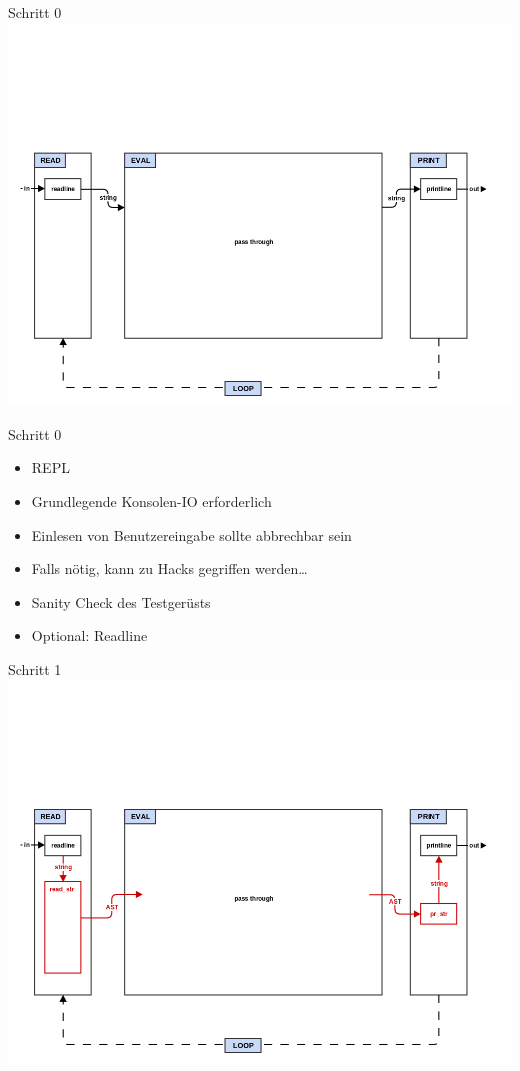 \documentclass[presentation]{beamer}
\begin{document}
\begin{frame}[label=sec-3-5]{Schritt 0}
\includegraphics[width=.9\linewidth]{./images/step0_repl.png}
\end{frame}

\begin{frame}[label=sec-3-6]{Schritt 0}
\begin{itemize}
\item REPL
\item Grundlegende Konsolen-IO erforderlich
\item Einlesen von Benutzereingabe sollte abbrechbar sein
\item Falls nötig, kann zu Hacks gegriffen werden\ldots{}
\item Sanity Check des Testgerüsts
\item Optional: Readline
\end{itemize}
\end{frame}

\begin{frame}[label=sec-3-7]{Schritt 1}
\includegraphics[width=.9\linewidth]{./images/step1_read_print.png}
\end{frame}
\end{document}
